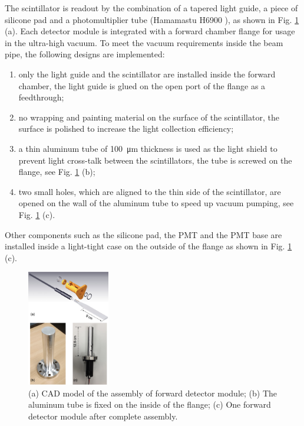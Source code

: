 \documentclass[number,5p]{elsarticle}
\begin{document}
The scintillator is readout by the combination of a tapered light guide, a piece of silicone pad and a
photomultiplier tube (Hamamastu H6900 \cite{hamamatsu}), as shown in Fig. \ref{fig:forward_module} (a).
Each detector module is integrated with a forward chamber flange for usage
in the ultra-high vacuum.
To meet the vacuum requirements inside the beam pipe, the following designs are implemented:
\begin{enumerate}
\item only the light guide and the scintillator are installed inside the forward chamber, the light guide is glued on the open port of the flange as a feedthrough;
\item no wrapping and painting material on the surface of the scintillator, the
  surface is polished to increase the light collection efficiency;
\item a thin aluminum tube of \SI{100}{\micro\meter} thickness is used as
  the light shield to prevent light cross-talk between the scintillators, the tube is screwed on the flange, see Fig. \ref{fig:forward_module} (b);
\item two small holes, which are aligned to the thin side of the scintillator, are opened on the wall of the aluminum tube to speed up vacuum pumping, see Fig. \ref{fig:forward_module} (c).
\end{enumerate}
Other components such as the silicone pad, the PMT and the PMT base are installed inside a light-tight case on the outside of the flange as shown in Fig. \ref{fig:forward_module} (c).
\begin{figure}[htbp]
  \centering
  \includegraphics[width=0.32\textwidth]{./forward_module.png}
  \caption{(a) CAD model of the assembly of forward detector module; (b) The aluminum tube is fixed on the inside of the flange; (c) One forward detector module after complete assembly.}
  \label{fig:forward_module}
\end{figure}
\end{document}
